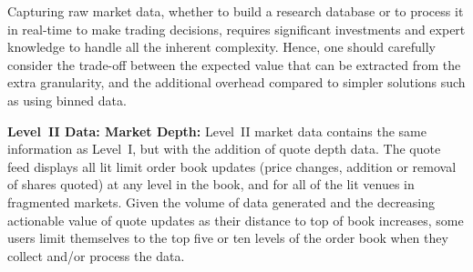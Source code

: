 Capturing raw market data, whether to build a research database or to process it in real-time to make trading decisions, requires significant investments and expert knowledge to handle all the inherent complexity. Hence, one should carefully consider the trade-off between the expected value that can be extracted from the extra granularity, and the additional overhead compared to simpler solutions such as using binned data. \twomedskip


\noindent\textbf{Level~II Data: Market Depth:}  Level~II market data contains the same information as Level~I, but with the addition of quote depth data. The quote feed displays all lit limit order book updates (price changes, addition or removal of shares quoted) at any level in the book, and for all of the lit venues in fragmented markets. Given the volume of data generated and the decreasing actionable value of quote updates as their distance to top of book increases, some users limit themselves to the top five or ten levels of the order book  when they collect and/or process the data. \label{in:level2dat1} \twomedskip


